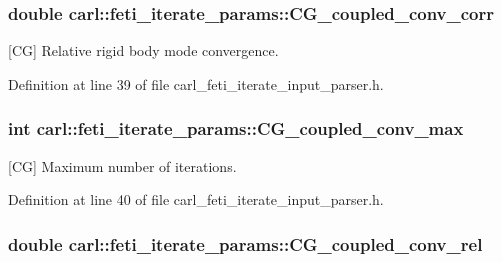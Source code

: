 \subsubsection[{C\+G\+\_\+coupled\+\_\+conv\+\_\+corr}]{\setlength{\rightskip}{0pt plus 5cm}double carl\+::feti\+\_\+iterate\+\_\+params\+::\+C\+G\+\_\+coupled\+\_\+conv\+\_\+corr}\label{structcarl_1_1feti__iterate__params_ac059145cfe8efc1f101e3dca789cf74d}


\mbox{[}C\+G\mbox{]} Relative rigid body mode convergence. 



Definition at line 39 of file carl\+\_\+feti\+\_\+iterate\+\_\+input\+\_\+parser.\+h.

\hypertarget{structcarl_1_1feti__iterate__params_a84ca6f789614c1f57bd00256706f6180}{}
\subsubsection[{C\+G\+\_\+coupled\+\_\+conv\+\_\+max}]{\setlength{\rightskip}{0pt plus 5cm}int carl\+::feti\+\_\+iterate\+\_\+params\+::\+C\+G\+\_\+coupled\+\_\+conv\+\_\+max}\label{structcarl_1_1feti__iterate__params_a84ca6f789614c1f57bd00256706f6180}


\mbox{[}C\+G\mbox{]} Maximum number of iterations. 



Definition at line 40 of file carl\+\_\+feti\+\_\+iterate\+\_\+input\+\_\+parser.\+h.

\hypertarget{structcarl_1_1feti__iterate__params_a27dca64808ece87470d8b3c8e29f1209}{}
\subsubsection[{C\+G\+\_\+coupled\+\_\+conv\+\_\+rel}]{\setlength{\rightskip}{0pt plus 5cm}double carl\+::feti\+\_\+iterate\+\_\+params\+::\+C\+G\+\_\+coupled\+\_\+conv\+\_\+rel}\label{structcarl_1_1feti__iterate__params_a27dca64808ece87470d8b3c8e29f1209}


